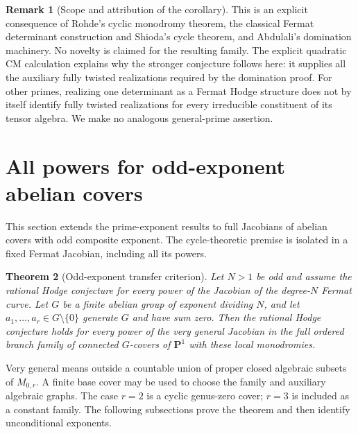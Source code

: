 \documentclass[11pt]{article}
\newtheorem{theorem}{Theorem}[section]
\theoremstyle{definition}
\newtheorem{remark}[theorem]{Remark}
\begin{document}
\begin{remark}[Scope and attribution of the corollary]
This is an explicit consequence of Rohde's cyclic monodromy theorem,
the classical Fermat determinant construction and Shioda's cycle
theorem, and Abdulali's domination machinery. No novelty is claimed
for the resulting family. The explicit quadratic CM calculation
explains why the stronger conjecture follows here: it supplies all
the auxiliary fully twisted realizations required by the domination
proof. For other primes, realizing one determinant as a Fermat
Hodge structure does not by itself identify fully twisted
realizations for every irreducible constituent of its tensor
algebra. We make no analogous general-prime assertion.
\end{remark}

\section{All powers for odd-exponent abelian covers}
\label{sec:odd-exponent}
This section extends the prime-exponent results to full Jacobians of
abelian covers with odd composite exponent. The cycle-theoretic premise
is isolated in a fixed Fermat Jacobian, including all its powers.

\begin{theorem}[Odd-exponent transfer criterion]
\label{thm:odd-exponent-criterion}
Let $N>1$ be odd and assume the rational Hodge conjecture for every
power of the Jacobian of the degree-$N$ Fermat curve. Let $G$ be a
finite abelian group of exponent dividing $N$, and let
$a_1,\ldots,a_r\in G\setminus\{0\}$ generate $G$ and have sum zero.
Then the rational Hodge conjecture holds for every power of the
very general Jacobian in the full ordered branch family of connected
$G$-covers of $\mathbf P^1$ with these local monodromies.
\end{theorem}

Very general means outside a countable union of proper closed algebraic
subsets of $M_{0,r}$. A finite base cover may be used to choose the family
and auxiliary algebraic graphs. The case $r=2$ is a cyclic genus-zero
cover; $r=3$ is included as a constant family. The following subsections
prove the theorem and then identify unconditional exponents.
\end{document}
